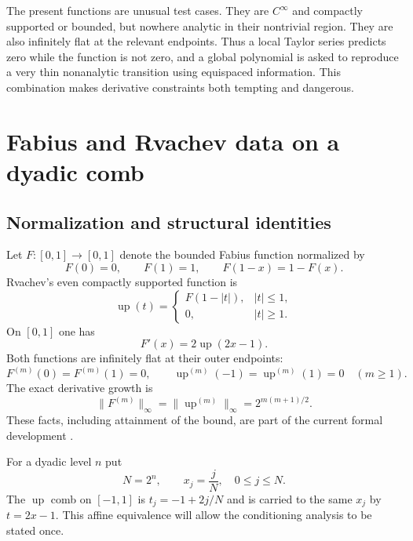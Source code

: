 \documentclass[11pt,oneside]{article}
\theoremstyle{definition}
\theoremstyle{remark}
\newcommand{\Up}{\operatorname{up}}
\begin{document}
The present functions are unusual test cases.  They are $C^\infty$ and compactly supported
or bounded, but nowhere analytic in their nontrivial region.  They are also infinitely flat
at the relevant endpoints.  Thus a local Taylor series predicts zero while the function is
not zero, and a global polynomial is asked to reproduce a very thin nonanalytic transition
using equispaced information.  This combination makes derivative constraints both tempting
and dangerous.

\section{Fabius and Rvachev data on a dyadic comb}
\label{sec:data}

\subsection{Normalization and structural identities}

Let $F:[0,1]\to[0,1]$ denote the bounded Fabius function normalized by
\begin{equation}
 F(0)=0,\qquad F(1)=1,\qquad F(1-x)=1-F(x).
 \label{eq:F-symmetry}
\end{equation}
Rvachev's even compactly supported function is
\begin{equation}
 \Up(t)=
 \begin{cases}
 F(1-|t|),& |t|\le1,\\
 0,& |t|\ge1.
 \end{cases}
 \label{eq:up-fold}
\end{equation}
On $[0,1]$ one has
\begin{equation}
 F'(x)=2\Up(2x-1).
 \label{eq:Fprime-up}
\end{equation}
Both functions are infinitely flat at their outer endpoints:
\begin{equation}
 F^{(m)}(0)=F^{(m)}(1)=0,
 \qquad
 \Up^{(m)}(-1)=\Up^{(m)}(1)=0
 \quad(m\ge1).
 \label{eq:endpoint-flatness}
\end{equation}
The exact derivative growth is
\begin{equation}
 \|F^{(m)}\|_\infty=\|\Up^{(m)}\|_\infty
 =2^{m(m+1)/2}.
 \label{eq:derivative-norm}
\end{equation}
These facts, including attainment of the bound, are part of the current formal development
\cite{proveitprimary}.

For a dyadic level $n$ put
\begin{equation}
 N=2^n,\qquad x_j=\frac{j}{N},\quad 0\le j\le N.
 \label{eq:dyadic-comb}
\end{equation}
The $\Up$ comb on $[-1,1]$ is $t_j=-1+2j/N$ and is carried to the same $x_j$ by
$t=2x-1$.  This affine equivalence will allow the conditioning analysis to be stated once.
\end{document}
